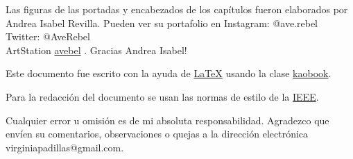 Las figuras de las portadas y  encabezados de los cap\'itulos fueron elaborados por Andrea Isabel Revilla. Pueden ver su portafolio  en Instagram:  @ave.rebel \\ Twitter: @AveRebel \\ ArtStation \href{https://linktr.ee/avebel}{avebel} . Gracias Andrea Isabel! 

Este documento fue escrito con la ayuda de \href{https://sourceforge.net/projects/koma-script/}{\KOMAScript}  \href{https://www.latex-project.org/}{\LaTeX} usando la clase \href{https://github.com/fmarotta/kaobook/}{kaobook}.

Para la redacci\'on del documento se usan las normas de estilo de la \href{https://uc3m.libguides.com/guias_tematicas/citas_bibliograficas/estilo-ieee}{IEEE}.

Cualquier error u omisi\'on es de mi absoluta responsabilidad. Agradezco que env\'ien su  comentarios, observaciones o quejas a la direcci\'on electr\'onica virginiapadillas@gmail.com.



